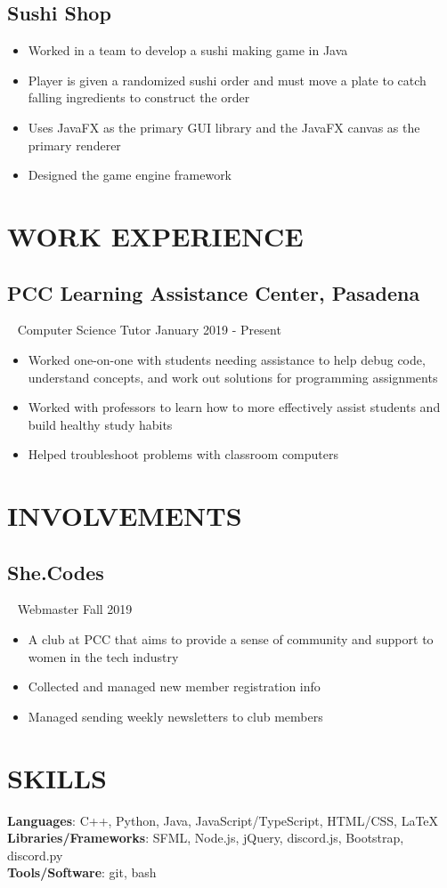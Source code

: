 \documentclass{article}
\begin{document}
\subsection*{Sushi Shop}
\begin{itemize}
    \item Worked in a team to develop a sushi making game in Java
    \item Player is given a randomized sushi order and must move a plate to catch falling ingredients to construct the order
    \item Uses JavaFX as the primary GUI library and the JavaFX canvas as the primary renderer 
    \item Designed the game engine framework
\end{itemize}

\section*{\textcolor{wordblue}{WORK EXPERIENCE}}
\subsection*{PCC Learning Assistance Center, Pasadena}
\ 
\scriptsize
\textcolor{wordgrey}{Computer Science Tutor}
\normalsize
\hfill
\textcolor{wordgrey}{January 2019 - Present}
\begin{itemize}
    \item Worked one-on-one with students needing assistance to help debug code, understand concepts, and work out solutions for programming assignments
    \item Worked with professors to learn how to more effectively assist students and build healthy study habits
    \item Helped troubleshoot problems with classroom computers
\end{itemize}
\section*{\textcolor{wordblue}{INVOLVEMENTS}}
\subsection*{She.Codes}
\ 
\scriptsize
\textcolor{wordgrey}{Webmaster}
\normalsize
\hfill
\textcolor{wordgrey}{Fall 2019}
\begin{itemize}
    \item A club at PCC that aims to provide a sense of community and support to women in the tech industry
    \item Collected and managed new member registration info
    \item Managed sending weekly newsletters to club members    
\end{itemize}
\section*{\textcolor{wordblue}{SKILLS}}
\textbf{Languages}: C++, Python, Java, JavaScript/TypeScript, HTML/CSS, LaTeX\\
\textbf{Libraries/Frameworks}: SFML, Node.js, jQuery, discord.js, Bootstrap, discord.py\\
\textbf{Tools/Software}: git, bash
\end{document}
